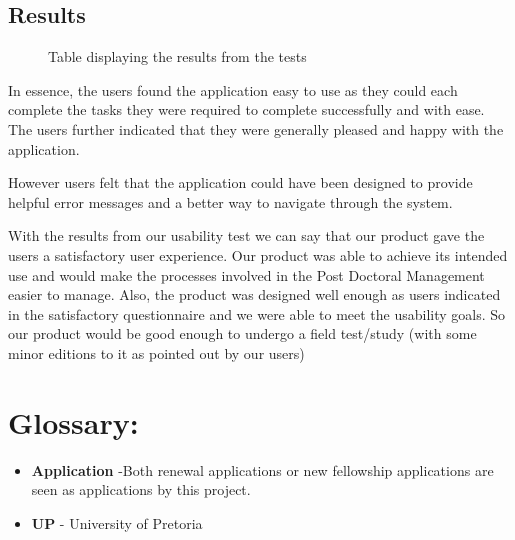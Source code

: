 \documentclass[12pt]{article}
\begin{document}
\subsection{Results}
\begin{figure}[H]
\centering	
{}
\caption{Table displaying the results from the tests}
\end{figure}

In essence, the users found the application easy to use as they could each complete the tasks they were required to complete successfully and with ease. The users further indicated that they were generally pleased and happy with the application.

However users felt that the application could have been designed to provide helpful error messages and a better way to navigate through the system.

With the results from our usability test we can say that our product gave the users a satisfactory user experience. Our product was able to achieve its intended use and would make the processes involved in the Post Doctoral Management easier to manage. Also, the product was designed well enough as users indicated in the satisfactory questionnaire and we were able to meet the usability goals. So our product would be good enough to undergo a field test/study (with some minor editions to it as pointed out by our users) 

\newpage


\section{Glossary:}
\vspace{0.2in}

\begin{itemize}

\item \textbf{Application} -Both renewal applications or new fellowship applications are seen as applications by this project.
\item \textbf{UP} - University of Pretoria
 


\end{itemize}	
\end{document}
